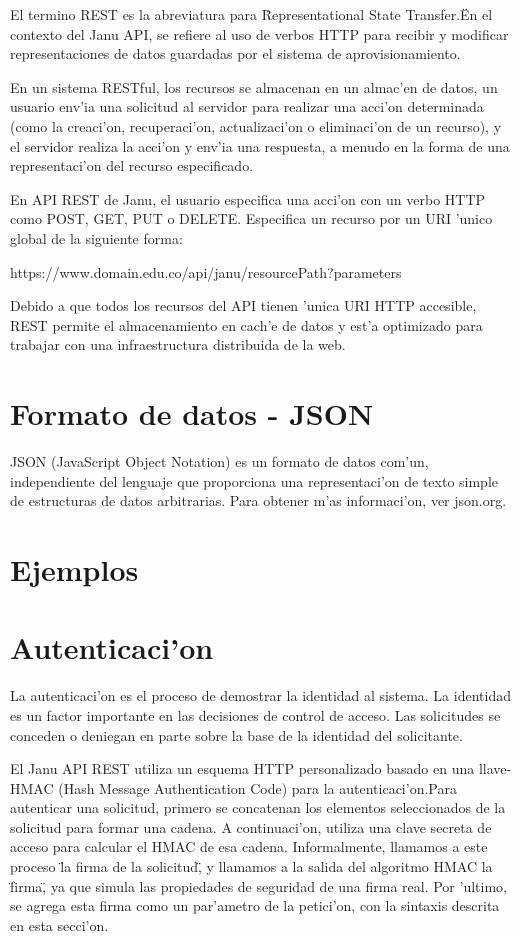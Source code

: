 El termino REST es la abreviatura para \"Representational State Transfer.\" En el contexto del Janu API, se refiere al uso de verbos HTTP para recibir y modificar representaciones de datos guardadas por el sistema de aprovisionamiento.

En un sistema RESTful, los recursos se almacenan en un almac'en de datos, un usuario env'ia una solicitud al servidor para realizar una acci'on determinada (como la creaci'on, recuperaci'on, actualizaci'on o eliminaci'on de un recurso), y el servidor realiza la acci'on y env'ia una respuesta, a menudo en la forma de una representaci'on del recurso especificado.


En API REST de Janu, el usuario especifica una acci'on con un verbo HTTP como POST, GET, PUT o DELETE. Especifica un recurso por un URI 'unico global de la siguiente forma:

https://www.domain.edu.co/api/janu/resourcePath?parameters

Debido a que todos los recursos del API tienen 'unica URI HTTP accesible, REST permite el almacenamiento en cach'e de datos y est'a optimizado para trabajar con una infraestructura distribuida de la web.

\section{Formato de datos - JSON}
JSON (JavaScript Object Notation) es un formato de datos com'un, independiente del lenguaje que proporciona una representaci'on de texto simple de estructuras de datos arbitrarias. Para obtener m'as informaci'on, ver json.org.

\section{Ejemplos}


\section{Autenticaci'on}

La autenticaci'on es el proceso de demostrar la identidad al sistema. La identidad es un factor importante en las decisiones de control de acceso. Las solicitudes se conceden o deniegan en parte sobre la base de la identidad del solicitante.

El Janu API REST utiliza un esquema HTTP personalizado basado en una llave-HMAC (Hash Message Authentication Code) para la autenticaci'on.Para autenticar una solicitud, primero se concatenan los elementos seleccionados de la solicitud para formar una cadena. A continuaci'on, utiliza una clave secreta de acceso para calcular el HMAC de esa cadena. Informalmente, llamamos a este proceso \"la firma de la solicitud\", y llamamos a la salida del algoritmo HMAC la \"firma\", ya que simula las propiedades de seguridad de una firma real. Por 'ultimo, se agrega esta firma como un par'ametro de la petici'on, con la sintaxis descrita en esta secci'on.


